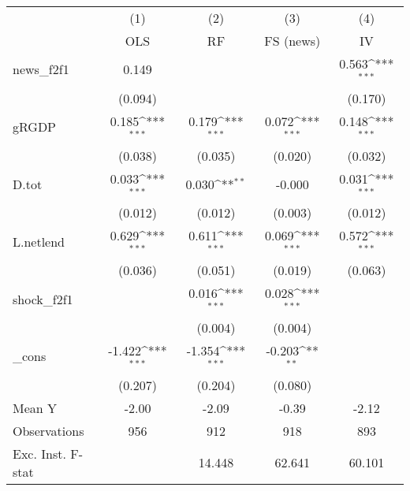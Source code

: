 {
\def\sym#1{\ifmmode^{#1}\else\(^{#1}\)\fi}
\begin{tabular}{l*{4}{c}}
\toprule
            &\multicolumn{1}{c}{(1)}&\multicolumn{1}{c}{(2)}&\multicolumn{1}{c}{(3)}&\multicolumn{1}{c}{(4)}\\
            &\multicolumn{1}{c}{OLS}&\multicolumn{1}{c}{RF}&\multicolumn{1}{c}{FS (news)}&\multicolumn{1}{c}{IV}\\
\midrule
news\_f2f1   &       0.149         &                     &                     &       0.563\sym{***}\\
            &     (0.094)         &                     &                     &     (0.170)         \\
\addlinespace
gRGDP       &       0.185\sym{***}&       0.179\sym{***}&       0.072\sym{***}&       0.148\sym{***}\\
            &     (0.038)         &     (0.035)         &     (0.020)         &     (0.032)         \\
\addlinespace
D.tot       &       0.033\sym{***}&       0.030\sym{**} &      -0.000         &       0.031\sym{***}\\
            &     (0.012)         &     (0.012)         &     (0.003)         &     (0.012)         \\
\addlinespace
L.netlend   &       0.629\sym{***}&       0.611\sym{***}&       0.069\sym{***}&       0.572\sym{***}\\
            &     (0.036)         &     (0.051)         &     (0.019)         &     (0.063)         \\
\addlinespace
shock\_f2f1  &                     &       0.016\sym{***}&       0.028\sym{***}&                     \\
            &                     &     (0.004)         &     (0.004)         &                     \\
\addlinespace
\_cons      &      -1.422\sym{***}&      -1.354\sym{***}&      -0.203\sym{**} &                     \\
            &     (0.207)         &     (0.204)         &     (0.080)         &                     \\
\midrule
Mean Y      &       -2.00         &       -2.09         &       -0.39         &       -2.12         \\
Observations&         956         &         912         &         918         &         893         \\
Exc. Inst. F-stat&                     &      14.448         &      62.641         &      60.101         \\
\bottomrule
\end{tabular}
}
